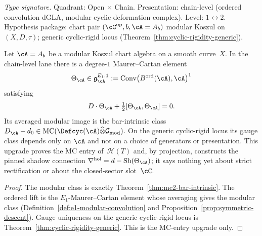 \begin{proposition}
\label{prop:hdm-upgrade-theta}
\emph{Type signature.} Quadrant: Open $\times$ Chain. Presentation:
chain-level (ordered convolution dGLA, modular cyclic deformation
complex). Level: $1\leftrightarrow 2$. Hypothesis package: chart
pair $(\cC^{\mathrm{op}}, b, \cA = A_b)$ modular Koszul on $(X,D,\tau)$;
generic cyclic-rigid locus
(Theorem~\textup{\ref{thm:cyclic-rigidity-generic}}).

Let $\cA = A_b$ be a modular Koszul chart algebra on a smooth
curve~$X$. In the chain-level lane there is a degree-$1$
Maurer--Cartan element
\[
\Theta_\cA \in
\mathfrak{g}^{E_1,1}_\cA
:=
\operatorname{Conv}\bigl(B^{\mathrm{ord}}(\cA),\cA\bigr)^1
\]
satisfying
\[
D\cdot\Theta_\cA + \tfrac{1}{2}[\Theta_\cA,\Theta_\cA]=0.
\]
Its averaged modular image is the bar-intrinsic class
$D_\cA-d_0 \in
\mathrm{MC}(\Defcyc(\cA)\widehat{\otimes}\mathcal G_{\mathrm{mod}})$.
On the generic cyclic-rigid locus its gauge class depends only on
$\cA$ and not on a choice of generators or presentation. This upgrade
proves the MC entry of~$\mathcal H(T)$ and, by projection,
constructs the pinned shadow connection
$\nabla^{\mathrm{hol}}=d-\operatorname{Sh}(\Theta_\cA)$; it says
nothing yet about strict rectification or about the closed-sector slot~$\cC$.
\end{proposition}

\begin{proof}
The modular class is exactly Theorem~\ref{thm:mc2-bar-intrinsic}. The
ordered lift is the $E_1$-Maurer--Cartan element whose averaging gives
the modular class \textup{(}Definition~\textup{\ref{def:e1-modular-convolution}}
and Proposition~\textup{\ref{prop:symmetric-descent}}\textup{)}.
Gauge uniqueness on the generic cyclic-rigid locus is
Theorem~\ref{thm:cyclic-rigidity-generic}. This is the MC-entry
upgrade only.
\end{proof}

